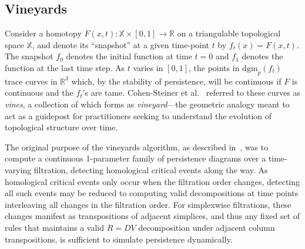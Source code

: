 \documentclass[sn-mathphys]{sn-jnl}
\begin{document}
\subsection{Vineyards}\label{sec:vineyards}
Consider a homotopy $F(x,t) : \mathbb{X} \times [0,1] \to \mathbb{R}$ on a triangulable topological space $\mathbb{X}$, and denote its ``snapshot'' at a given time-point $t$ by $f_t(x) = F(x,t)$.
The snapshot $f_0$ denotes the initial function at time $t = 0$ and $f_1$ denotes the function at the last time step. 
As $t$ varies in $[0,1]$, the points in $\mathrm{dgm}_p(f_t)$ trace curves in $\mathbb{R}^3$ which, by the stability of persistence, will be continuous if $F$ is continuous and the $f_t$'s are tame.
Cohen-Steiner et al.~\cite{cohen2007stability} referred to these curves as \emph{vines}, a collection of which forms as \emph{vineyard}---the geometric analogy meant to act as a guidepost for practitioners seeking to understand the evolution of topological structure over time.

The original purpose of the vineyards algorithm, as described in~\cite{cohen2006vines}, was to compute a continuous 1-parameter family of persistence diagrams over a time-varying filtration, detecting homological critical events along the way.
As homological critical events only occur when the filtration order changes, detecting all such events may be reduced to computing valid decompositions at   time points interleaving all changes in the filtration order. 
For simplexwise filtrations, these changes manifest as transpositions of adjacent simplices, and thus any fixed set of rules that maintains a valid $R = D V$ decomposition under adjacent column transpositions, is sufficient to simulate persistence dynamically. 
\end{document}
